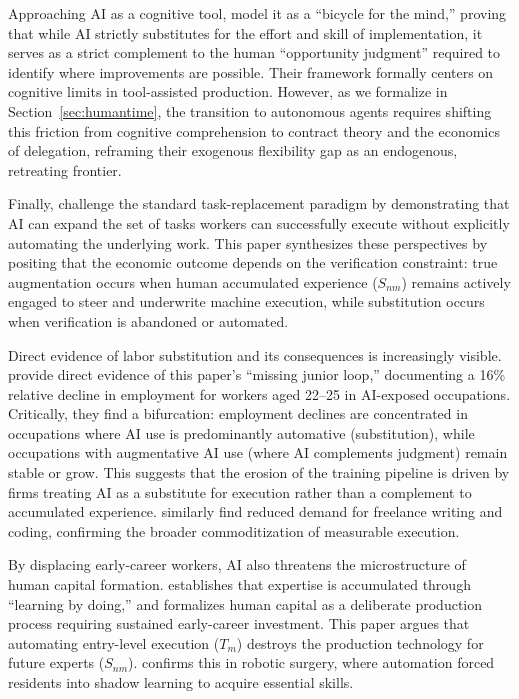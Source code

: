 \documentclass[12pt, letter]{article}
\begin{document}
Approaching AI as a cognitive tool, \citet{AgrawalGansGoldfarbBicycles} model it as a ``bicycle for the mind,'' proving that while AI strictly substitutes for the effort and skill of implementation, it serves as a strict complement to the human ``opportunity judgment'' required to identify where improvements are possible. Their framework formally centers on cognitive limits in tool-assisted production. However, as we formalize in Section~\ref{sec:humantime}, the transition to autonomous agents requires shifting this friction from cognitive comprehension to contract theory and the economics of delegation, reframing their exogenous flexibility gap as an endogenous, retreating frontier.

Finally, \citet{AgrawalMcHaleOettl2026} challenge the standard task-replacement paradigm by demonstrating that AI can expand the set of tasks workers can successfully execute without explicitly automating the underlying work. This paper synthesizes these perspectives by positing that the economic outcome depends on the verification constraint: true augmentation occurs when human accumulated experience ($S_{nm}$) remains actively engaged to steer and underwrite machine execution, while substitution occurs when verification is abandoned or automated. 

Direct evidence of labor substitution and its consequences is increasingly visible. \citet{Brynjolfsson2025} provide direct evidence of this paper's ``missing junior loop,'' documenting a 16\% relative decline in employment for workers aged 22--25 in AI-exposed occupations. Critically, they find a bifurcation: employment declines are concentrated in occupations where AI use is predominantly automative (substitution), while occupations with augmentative AI use (where AI complements judgment) remain stable or grow. This suggests that the erosion of the training pipeline is driven by firms treating AI as a substitute for execution rather than a complement to accumulated experience. \citet{Hui2024} similarly find reduced demand for freelance writing and coding, confirming the broader commoditization of measurable execution.

By displacing early-career workers, AI also threatens the microstructure of human capital formation. \citet{Arrow1962} establishes that expertise is accumulated through ``learning by doing,'' and \citet{Ben-Porath1967} formalizes human capital as a deliberate production process requiring sustained early-career investment. This paper argues that automating entry-level execution ($T_m$) destroys the production technology for future experts ($S_{nm}$). \citet{Beane2019} confirms this in robotic surgery, where automation forced residents into shadow learning to acquire essential skills.
\end{document}
